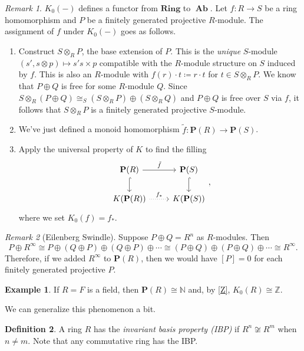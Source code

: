 \documentclass[10pt,letterpaper,cm]{nupset}
\theoremstyle{definition}
\newtheorem{definition}{Definition}
\newtheorem{exmp}[definition]{Example}
\theoremstyle{theorem}
\theoremstyle{remark}
\newtheorem{remark}{Remark}
\newcommand{\N}{\mathbb N}
\renewcommand{\P}{\mathbf P}
\newcommand{\Z}{\mathbb Z}
\newcommand{\1}{\mathbf{1}}
\newcommand{\0}{\vec 0}
\DeclareMathOperator{\Ab}{\mathbf{Ab}}
\begin{document}
\begin{remark}
$K_0(-)$ defines a functor from $\mathbf{Ring}$ to $\Ab$. Let $f: R \to S$ be a ring homomorphism and $P$ be a finitely generated projective $R$-module. The assignment of $f$ under $K_0(-)$ goes as follows.
\begin{enumerate}
\item Construct $S\otimes_R P$, the base extension of $P$. This is the \textit{unique} $S$-module $(s', s \otimes p) \mapsto  s's \times p$ compatible with the $R$-module structure on $S$ induced by $f$. This is also an $R$-module with $f(r) \cdot t \coloneqq r\cdot t$ for $t\in S \otimes_R P$. We know that $P \oplus Q$ is free for some $R$-module $Q$. Since $S\otimes_R (P \oplus Q) \cong_S (S \otimes_R P)\oplus (S \otimes_R Q)$ and $P\oplus Q$ is free over $S$ via $f$, it follows that  $S \otimes_R P$ is a finitely generated projective $S$-module.
\item We've just defined a monoid homomorphism $\tilde{f} : \P(R) \to \P(S)$.
\item Apply the universal property of $K$ to find the filling 
\[
\begin{tikzcd}
\mathbf{P}(R) \arrow[d, hook] \arrow[r, "\tilde{f}"] & \mathbf{P}(S) \arrow[d, hook] \\
K(\mathbf{P}(R)) \arrow[r, "f_{\ast}", dotted] & K(\mathbf{P}(S))
\end{tikzcd},
\]
where we set $K_0(f) = f_{\ast}$.
\end{enumerate}
\end{remark}

\begin{remark}[Eilenberg Swindle]
Suppose $P \oplus Q =R^n$ as $R$-modules. Then $$P \oplus R^{\infty} \cong P \oplus  (Q \oplus P) \oplus (Q \oplus P) \oplus \cdots \cong (P \oplus Q) \oplus (P \oplus Q) \oplus \cdots \cong R^{\infty}.$$
Therefore, if we added $R^{\infty}$ to $\P(R)$, then we would have $[P] = 0$ for each finitely generated projective $P$.
\end{remark}

\begin{exmp}
If $R =F$ is a field, then $\P(R) \cong \N$ and, by \cref{Z}, $K_0(R) \cong \Z$. 

We can generalize this phenomenon a bit.
\end{exmp}

\begin{definition}
A ring $R$ has the \textit{invariant basis property (IBP)} if $R^n \not \cong R^m$ when $n \ne m$. Note that any commutative ring has the IBP.
\end{definition}
\end{document}
